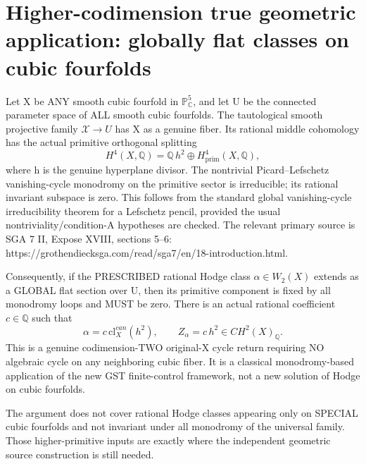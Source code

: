\documentclass[11pt]{article}
\begin{document}
\section{Higher-codimension true geometric application: globally flat classes on cubic fourfolds}
Let X be ANY smooth cubic fourfold in
\(\mathbb P^5_{\mathbb C}\), and let U be
the connected parameter space of ALL
smooth cubic fourfolds. The tautological
smooth projective family \(\mathcal X\to U\)
has X as a genuine fiber.
Its rational middle cohomology has
the actual primitive orthogonal splitting
\[
H^4(X,\mathbb Q)
=\mathbb Q\,h^2\oplus H^4_{\mathrm{prim}}(X,\mathbb Q),
\]
where h is the genuine hyperplane divisor.
The nontrivial Picard--Lefschetz vanishing-cycle
monodromy on the primitive sector is
irreducible; its rational invariant subspace
is zero. This follows from the standard
global vanishing-cycle irreducibility theorem
for a Lefschetz pencil, provided the
usual nontriviality/condition-A hypotheses
are checked. The relevant primary source
is SGA 7 II, Expose XVIII, sections 5--6:
https://grothendiecksga.com/read/sga7/en/18-introduction.html.

Consequently, if the PRESCRIBED rational
Hodge class \(\alpha\in W_2(X)\)
extends as a GLOBAL flat section over U,
then its primitive component is fixed
by all monodromy loops and MUST be zero.
There is an actual rational coefficient
\(c\in\mathbb Q\) such that
\[
\boxed{\alpha=c\,\mathrm{cl}^{can}_X(h^2),
\qquad Z_\alpha=c\,h^2\in CH^2(X)_{\mathbb Q}.}
\]
This is a genuine codimension-TWO original-X
cycle return requiring NO algebraic cycle
on any neighboring cubic fiber.
It is a classical monodromy-based application
of the new GST finite-control framework,
not a new solution of Hodge on cubic fourfolds.

The argument does not cover rational Hodge
classes appearing only on SPECIAL cubic
fourfolds and not invariant under all
monodromy of the universal family.
Those higher-primitive inputs are exactly
where the independent geometric source
construction is still needed.
\end{document}
